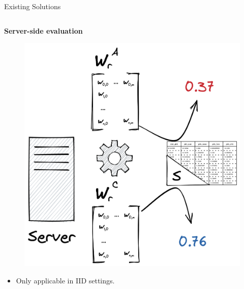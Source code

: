 \begin{frame}{Existing Solutions}

  \begin{columns}[T]
    
    \begin{column}{.33\textwidth}
      \small\centering
      \textbf{Server-side evaluation}~\autocite{zhou_DifferentiallyPrivateFederated_2022}

      \begin{figure}
        \centering
        \includegraphics[height=.36\textheight]{figures/radar/server-side-eval}
      \end{figure}

      \begin{itemize}\smaller
        \item Only applicable in IID settings.
      \end{itemize}
    \end{column}

\end{columns}
\end{frame}
